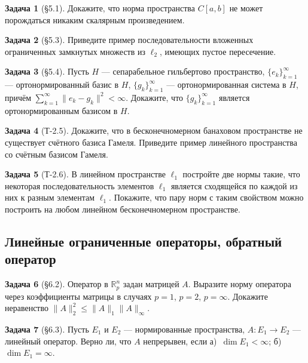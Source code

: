 \documentclass{article}
\theoremstyle{definition}
\newtheorem{problem}{Задача}
\newcommand{\R}{\mathbb R}
\begin{document}
\begin{problem}[\S 5.1]
Докажите, что норма пространства $C[a,b]$ не может порождаться 
никаким скалярным произведением.
\end{problem}

\begin{problem}[\S 5.3]
Приведите пример последовательности вложенных ограниченных замкнутых множеств из $\ell_2$,
имеющих пустое пересечение.
\end{problem}

\begin{problem}[\S 5.4]
Пусть $H$ --- сепарабельное гильбертово пространство, $\{e_k\}_{k=1}^\infty$
--- ортонормированный базис в $H$, $\{g_k\}_{k=1}^\infty$ --- ортонормированная система в $H$,
причём $\sum_{k=1}^\infty \|e_k - g_k\|^2 < \infty$.
Докажите, что $\{g_k\}_{k=1}^\infty$ является ортонормированным базисом в $H$.
\end{problem}

\begin{problem}[Т-2.5]
Докажите, что в бесконечномерном банаховом пространстве не существует счётного базиса Гамеля.
Приведите пример линейного пространства со счётным базисом Гамеля.
\end{problem}

\begin{problem}[Т-2.6]
В линейном пространстве $\ell_1$ постройте две нормы такие, что некоторая последовательность элементов
$\ell_1$ является сходящейся по каждой из них к разным элементам $\ell_1$.
Покажите, что пару норм с таким свойством можно построить на любом линейном бесконечномерном пространстве.
\end{problem}

\subsection{Линейные ограниченные операторы, обратный оператор}

\begin{problem}[\S 6.2]
Оператор в $\R^n_p$ задан матрицей $A$. Выразите норму оператора
через коэффициенты матрицы в случаях $p=1$, $p=2$, $p=\infty$.
Докажите неравенство $\|A\|_2^2 \le \|A\|_1 \|A\|_\infty$.
\end{problem}

\begin{problem}[\S 6.3]
Пусть $E_1$ и $E_2$ --- нормированные пространства, $A\colon E_1 \to E_2$ --- линейный оператор.
Верно ли, что $A$ непрерывен, если
а)~$\dim E_1 < \infty$; б)~$\dim E_1 = \infty$.
\end{problem}
\end{document}
